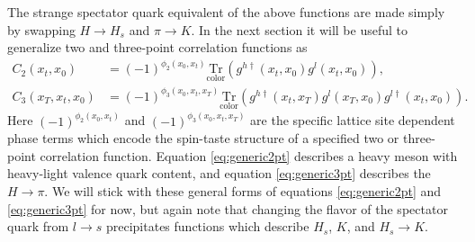 The strange spectator quark equivalent of the above functions are made simply by swapping $H\rightarrow H_s$ and $\pi\rightarrow K$. In the next section it will be useful to generalize two and three-point correlation functions as
\begin{align}\label{eq:generic2pt}
    C_2(x_t,x_0) &= (-1)^{\phi_2(x_0,x_t)}\mathrm{\underset{color}{Tr}}\left(g^{h\dagger}(x_t,x_0)g^l(x_t,x_0)\right),\\ \label{eq:generic3pt}
    C_3(x_T,x_t,x_0) &= (-1)^{\phi_3(x_0,x_t,x_T)}
    \mathrm{\underset{color}{Tr}}\left(g^{h\dagger}(x_t,x_T)g^l(x_T,x_0)g^{l\dagger}(x_t,x_0)\right).
\end{align}
Here $(-1)^{\phi_2(x_0,x_t)}$ and $(-1)^{\phi_3(x_0,x_t,x_T)}$ are the specific lattice site dependent phase terms which encode the spin-taste structure of a specified two or three-point correlation function.  Equation \ref{eq:generic2pt} describes a heavy meson with heavy-light valence quark content, and equation \ref{eq:generic3pt} describes the $H \rightarrow \pi$. %
We will stick with these general forms of equations \ref{eq:generic2pt} and \ref{eq:generic3pt} for now, but again note that changing the flavor of the spectator quark from $l\rightarrow s$ precipitates functions which describe $H_s$, $K$, and $H_s \rightarrow K$.

